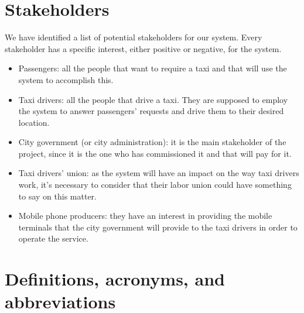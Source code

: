 \section{Stakeholders}
We have identified a list of potential stakeholders for our system. Every stakeholder has a specific interest, either positive or negative, for the system.
\begin{itemize}
\item Passengers: all the people that want to require a taxi and that will use the system to accomplish this.
\item Taxi drivers: all the people that drive a taxi. They are supposed to employ the system to answer passengers' requests and drive them to their desired location.
\item City government (or city administration): it is the main stakeholder of the project, since it is the one who has commissioned it and that will pay for it.
\item Taxi drivers' union: as the system will have an impact on the way taxi drivers work, it's necessary to consider that their labor union could have something to say on this matter. 
\item Mobile phone producers: they have an interest in providing the mobile terminals that the city government will provide to the taxi drivers in order to operate the service. 
\end{itemize}


\section{Definitions, acronyms, and abbreviations}
